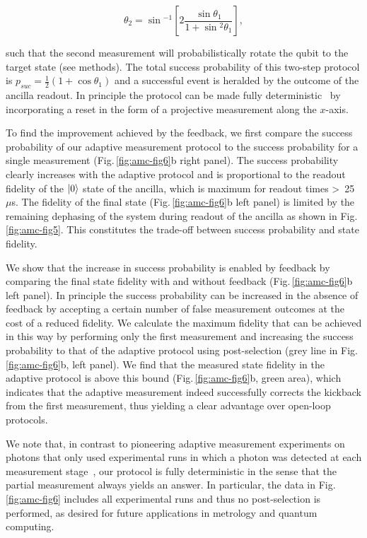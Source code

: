 \begin{equation}
\theta_2 = \sin{^{-1}\left[2 \frac{\sin{\theta_1}}{1 + \sin{^2 \theta_1}}\right]},
\end{equation}

such that the second measurement will probabilistically rotate the qubit to the target state (see methods). The total success probability of this two-step protocol is  $p_{suc} = \frac{1}{2}(1 + \cos{\theta_1})$ and a successful event is heralded by the outcome of the ancilla readout. In principle the protocol can be made fully deterministic~\cite{Ashhab_PhysRevA_2010} by incorporating a reset in the form of a projective measurement along the $x$-axis.

To find the improvement achieved by the feedback, we first compare the success probability of our adaptive measurement protocol to the success probability for a single measurement (Fig.\,\ref{fig:amc-fig6}b right panel). The success probability clearly increases with the adaptive protocol and is proportional to the readout fidelity of the $\left|0\right>$ state of the ancilla, which is maximum for readout times  \textgreater~25~$\mu$s. The fidelity of the final state (Fig.\,\ref{fig:amc-fig6}b left panel) is limited by the remaining dephasing of the system during readout of the ancilla as shown in Fig.\,\ref{fig:amc-fig5}. This constitutes the trade-off between success probability and state fidelity. 

We show that the increase in success probability is enabled by feedback by comparing the final state fidelity with and without feedback (Fig.\,\ref{fig:amc-fig6}b left panel). In principle the success probability can be increased in the absence of feedback by accepting a certain number of false measurement outcomes at the cost of a reduced fidelity. We calculate the maximum fidelity that can be achieved in this way by performing only the first measurement and increasing the success probability to that of the adaptive protocol using post-selection (grey line in Fig.\,\ref{fig:amc-fig6}b, left panel). We find that the measured state fidelity in the adaptive protocol is above this bound (Fig.\,\ref{fig:amc-fig6}b, green area), which indicates that the adaptive measurement indeed successfully corrects the kickback from the first measurement, thus yielding a clear advantage over open-loop protocols.



We note that, in contrast to pioneering adaptive measurement experiments on photons that only used experimental runs in which a photon was detected at each measurement stage~\cite{Prevedel_Nature_2007}, our protocol is fully deterministic in the sense that the partial measurement always yields an answer. In particular, the data in Fig.\,\ref{fig:amc-fig6} includes all experimental runs and thus no post-selection is performed, as desired for future applications in metrology and quantum computing. 

